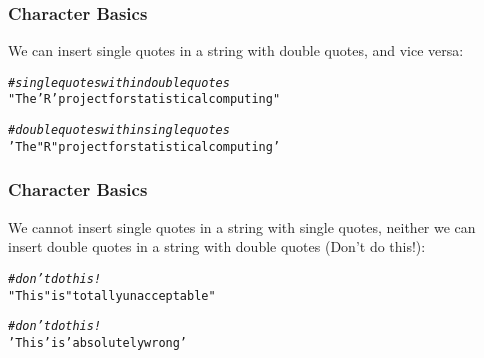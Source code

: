 \documentclass[12pt]{beamer}\usepackage[]{graphicx}\usepackage[]{color}
\makeatletter
\newcommand{\hlstr}[1]{\textcolor[rgb]{0.192,0.494,0.8}{#1}}%
\newcommand{\hlcom}[1]{\textcolor[rgb]{0.678,0.584,0.686}{\textit{#1}}}%
\newenvironment{kframe}{%
 \def\at@end@of@kframe{}%
 \ifinner\ifhmode%
  \def\at@end@of@kframe{\end{minipage}}%
  \begin{minipage}{\columnwidth}%
 \fi\fi%
 \def\FrameCommand##1{\hskip\@totalleftmargin \hskip-\fboxsep
 \colorbox{shadecolor}{##1}\hskip-\fboxsep
     \hskip-\linewidth \hskip-\@totalleftmargin \hskip\columnwidth}%
 \MakeFramed {\advance\hsize-\width
   \@totalleftmargin\z@ \linewidth\hsize
   \@setminipage}}%
 {\par\unskip\endMakeFramed%
 \at@end@of@kframe}
\newenvironment{knitrout}{}{} %
\makeatother
\begin{document}
\begin{frame}[fragile]
\frametitle{Character Basics}

We can insert single quotes in a string with double quotes, and vice versa:
\begin{knitrout}\footnotesize
{}\color{fgcolor}\begin{kframe}
\begin{alltt}
\hlcom{# single quotes within double quotes}
\hlstr{"The 'R' project for statistical computing"}
\end{alltt}
\end{kframe}
\end{knitrout}

\begin{knitrout}\footnotesize
{}\color{fgcolor}\begin{kframe}
\begin{alltt}
\hlcom{# double quotes within single quotes}
\hlstr{'The "R" project for statistical computing'}
\end{alltt}
\end{kframe}
\end{knitrout}

\end{frame}


\begin{frame}[fragile]
\frametitle{Character Basics}

We cannot insert single quotes in a string with single quotes, neither we can insert double quotes in a string with double quotes (Don't do this!):
\begin{knitrout}\footnotesize
{}\color{fgcolor}\begin{kframe}
\begin{alltt}
\hlcom{# don't do this!}
\hlstr{"This "}is\hlstr{" totally unacceptable"}
\end{alltt}
\end{kframe}
\end{knitrout}
                                                            
\begin{knitrout}\footnotesize
{}\color{fgcolor}\begin{kframe}
\begin{alltt}
\hlcom{# don't do this!}
\hlstr{'This '}is\hlstr{' absolutely wrong'}
\end{alltt}
\end{kframe}
\end{knitrout}

\end{frame}
\end{document}
